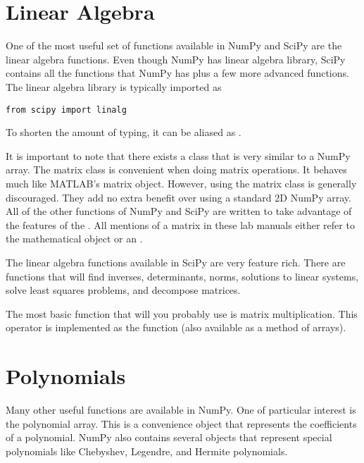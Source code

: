 \section*{Linear Algebra}
One of the most useful set of functions available in NumPy and SciPy are the linear algebra functions.
Even though NumPy has linear algebra library, SciPy contains all the functions that NumPy has plus a few more advanced functions.
The linear algebra library is typically imported as
\begin{lstlisting}
from scipy import linalg
\end{lstlisting}
To shorten the amount of typing, it can be aliased as .

It is important to note that there exists a  class that is very similar to a NumPy array.  
The matrix class is convenient when doing matrix operations. 
It behaves much like MATLAB's matrix object.
However, using the matrix class is generally discouraged.  They add no extra benefit over using a standard 2D NumPy array.
All of the other functions of NumPy and SciPy are written to take advantage of the features of the .  
All mentions of a matrix in these lab manuals either refer to the mathematical object or an .

The linear algebra functions available in SciPy are very feature rich.
There are functions that will find inverses, determinants, norms, solutions to linear systems, solve least squares problems, and decompose matrices.

The most basic function that will you probably use is matrix multiplication.  This operator is implemented as the  function (also available as a method of arrays).

\section*{Polynomials}
Many other useful functions are available in NumPy.  One of particular interest is the polynomial array.
This is a convenience object that represents the coefficients of a polynomial.
NumPy also contains several objects that represent special polynomials like Chebyshev, Legendre, and Hermite polynomials.



